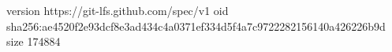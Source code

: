 version https://git-lfs.github.com/spec/v1
oid sha256:ae4520f2e93dcf8e3ad434c4a0371ef334d5f4a7c9722282156140a426226b9d
size 174884
